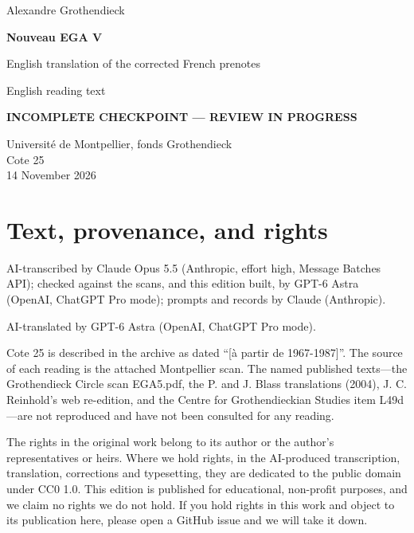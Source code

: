 \documentclass[10pt,a4paper]{article}
\newcommand{\EditionForm}{English reading text}
\begin{document}
\hypersetup{pageanchor=false}\begin{titlepage}\thispagestyle{empty}\vspace*{20mm}
{\Large Alexandre Grothendieck\par}\vspace{12mm}
{\Huge\bfseries Nouveau EGA V\par}\vspace{8mm}
{\Large English translation of the corrected French prenotes\par}\vspace{7mm}
{\large\EditionForm\par}\vspace{12mm}
{\large\bfseries\color{deletedred}INCOMPLETE CHECKPOINT — REVIEW IN PROGRESS\par}\vspace{10mm}
Université de Montpellier, fonds Grothendieck\\ Cote 25\\
14 November 2026
\vfill\end{titlepage}\clearpage\hypersetup{pageanchor=true}
\section*{Text, provenance, and rights}
AI-transcribed by Claude Opus 5.5 (Anthropic, effort high, Message Batches API); checked against the scans, and this edition built, by GPT-6 Astra (OpenAI, ChatGPT Pro mode); prompts and records by Claude (Anthropic).

AI-translated by GPT-6 Astra (OpenAI, ChatGPT Pro mode).

Cote 25 is described in the archive as dated ``[à partir de 1967-1987]''. The source of each reading is the attached Montpellier scan. The named published texts---the Grothendieck Circle scan EGA5.pdf, the P. and J. Blass translations (2004), J. C. Reinhold's web re-edition, and the Centre for Grothendieckian Studies item L49d---are not reproduced and have not been consulted for any reading.

The rights in the original work belong to its author or the author's representatives or heirs. Where we hold rights, in the AI-produced transcription, translation, corrections and typesetting, they are dedicated to the public domain under CC0 1.0. This edition is published for educational, non-profit purposes, and we claim no rights we do not hold. If you hold rights in this work and object to its publication here, please open a GitHub issue and we will take it down.
\end{document}
